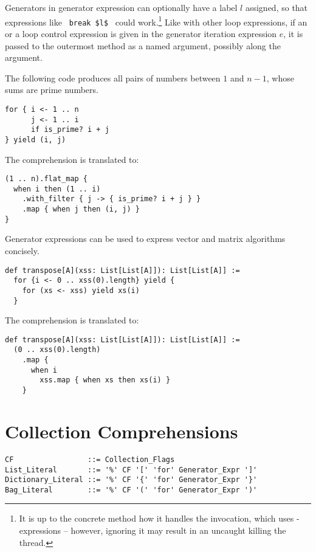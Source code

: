 Generators in generator expression can optionally have a label $l$ assigned, so that expressions like ~\lstinline!break $l$!~ could work.\footnote{It is up to the concrete method how it handles the invocation, which uses - expressions -- however, ignoring it may result in an uncaught  killing the thread.} Like with other loop expressions, if an  or a  loop control expression is given in the generator iteration expression $e$, it is passed to the outermost  method as a named argument, possibly along the  argument. 

\example The following code produces all pairs of numbers between $1$ and $n - 1$, whose sums are prime numbers. 
\begin{lstlisting}
for { i <- 1 .. n
      j <- 1 .. i
      if is_prime? i + j
} yield (i, j)
\end{lstlisting}
The comprehension is translated to:
\begin{lstlisting}
(1 .. n).flat_map {
  when i then (1 .. i)
    .with_filter { j -> { is_prime? i + j } }
    .map { when j then (i, j) }
}
\end{lstlisting}

\example Generator expressions can be used to express vector and matrix algorithms concisely.
\begin{lstlisting}
def transpose[A](xss: List[List[A]]): List[List[A]] :=
  for {i <- 0 .. xss(0).length} yield {
    for (xs <- xss) yield xs(i)
  }
\end{lstlisting} 
The comprehension is translated to: 
\begin{lstlisting}
def transpose[A](xss: List[List[A]]): List[List[A]] := 
  (0 .. xss(0).length)
    .map { 
      when i 
        xss.map { when xs then xs(i) }
    }
\end{lstlisting}






\section{Collection Comprehensions}
\label{sec:collection-comprehensions}

\syntax\begin{lstlisting}
CF                 ::= Collection_Flags
List_Literal       ::= '%' CF '[' 'for' Generator_Expr ']'
Dictionary_Literal ::= '%' CF '{' 'for' Generator_Expr '}'
Bag_Literal        ::= '%' CF '(' 'for' Generator_Expr ')'
\end{lstlisting}

